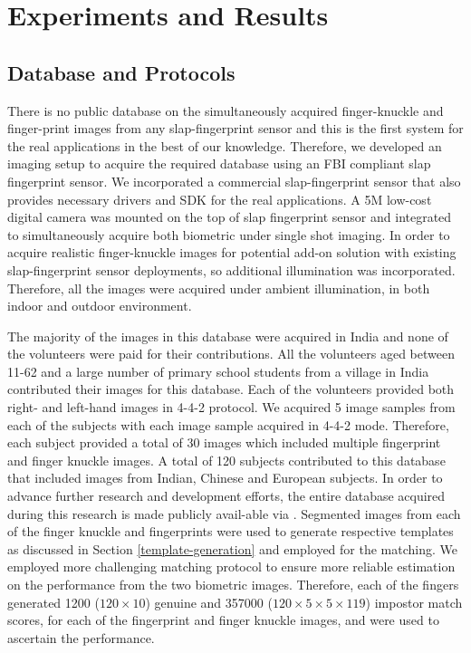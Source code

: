 \section{Experiments and Results\label{experiment}}

\subsection{Database and Protocols\label{database-protocol}}

There is no public database on the simultaneously acquired finger-knuckle and finger-print images from any slap-fingerprint sensor and this is the first system for the real applications in the best of our knowledge. Therefore, we developed an imaging setup to acquire the required database using an FBI compliant slap fingerprint sensor. We incorporated a commercial slap-fingerprint sensor \cite{futronic} that also provides necessary drivers and SDK for the real applications. A 5M low-cost digital camera \cite{mindvision} was mounted on the top of slap fingerprint sensor and integrated to simultaneously acquire both biometric under single shot imaging. In order to acquire realistic finger-knuckle images for potential add-on solution with existing slap-fingerprint sensor deployments, so additional illumination was incorporated. Therefore, all the images were acquired under ambient illumination, in both indoor and outdoor environment.

The majority of the images in this database were acquired in India and none of the volunteers were paid for their contributions. All the volunteers aged between 11-62 and a large number of primary school students from a village in India contributed their images for this database. Each of the volunteers provided both right- and left-hand images in 4-4-2 protocol. We acquired 5 image samples from each of the subjects with each image sample acquired in 4-4-2 mode. Therefore, each subject provided a total of 30 images which included multiple fingerprint and finger knuckle images. A total of 120 subjects contributed to this database that included images from Indian, Chinese and European subjects. In order to advance further research and development efforts, the entire database acquired during this research is made publicly avail-able via \cite{datalink}. Segmented images from each of the finger knuckle and fingerprints were used to generate respective templates as discussed in Section \ref{template-generation} and employed for the matching. We employed more challenging matching protocol to ensure more reliable estimation on the performance from the two biometric images. Therefore, each of the fingers generated 1200 ($120 \times 10$) genuine and 357000 ($120 \times 5 \times 5 \times 119$) impostor match scores, for each of the fingerprint and finger knuckle images, and were used to ascertain the performance.  